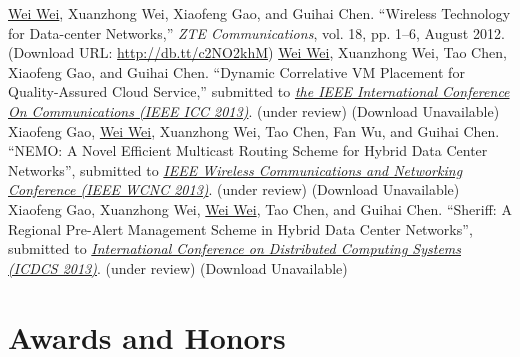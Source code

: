 \documentclass[11pt,a4paper]{moderncv}
\begin{document}
%

\begin{thebibliography}{10}
 \underline{Wei Wei}, Xuanzhong Wei, Xiaofeng Gao, and Guihai Chen. ``Wireless Technology for Data-center Networks,'' \emph{ZTE Communications}, vol. 18, pp. 1--6, August 2012. (Download URL: \url{http://db.tt/c2NO2khM})
\vspace{-3mm}
 \underline{Wei Wei}, Xuanzhong Wei, Tao Chen, Xiaofeng Gao, and Guihai Chen. ``Dynamic Correlative VM Placement for Quality-Assured Cloud Service,'' submitted to \href{http://www.ieee-icc.org/2013/}{\emph{the IEEE International Conference On Communications (IEEE ICC 2013)}}. (under review) (Download Unavailable)
\vspace{-3mm}
 Xiaofeng Gao, \underline{Wei Wei}, Xuanzhong Wei, Tao Chen, Fan Wu, and Guihai Chen. ``NEMO: A Novel Efficient Multicast Routing Scheme for Hybrid Data Center Networks'', submitted to \href{}{\emph{IEEE Wireless Communications and Networking Conference (IEEE WCNC 2013)}}. (under review) (Download Unavailable)
\vspace{-3mm}
 Xiaofeng Gao, Xuanzhong Wei, \underline{Wei Wei}, Tao Chen, and Guihai Chen. ``Sheriff: A Regional Pre-Alert Management Scheme in Hybrid Data Center Networks'', submitted to \href{http://infocom.di.unimi.it/}{\emph{International Conference on Distributed Computing Systems (ICDCS 2013)}}. (under review) (Download Unavailable)
\end{thebibliography}

\section{Awards and Honors}
\vspace{-8mm}
\vspace{-8mm}
\vspace{-8mm}
\vspace{-8mm}
\vspace{-8mm}
\vspace{-5mm}
\vspace{-5mm}
\end{document}
